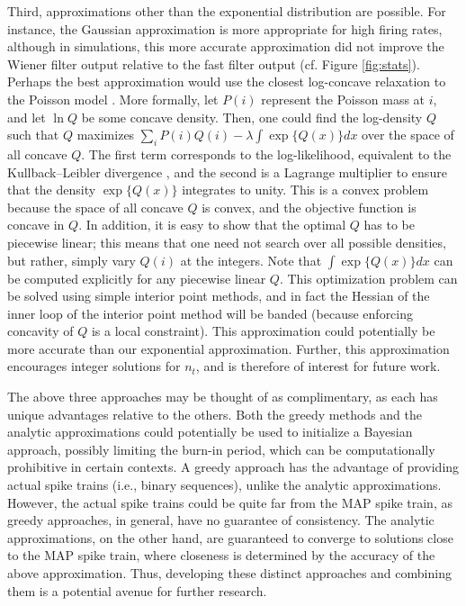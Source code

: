 Third, approximations other than the exponential distribution are possible. For instance, the Gaussian approximation is more appropriate for high firing rates, although in simulations, this more accurate approximation did not improve the Wiener filter output relative to the fast filter output (cf. Figure \ref{fig:stats}).  %
Perhaps the best approximation would use the closest log-concave relaxation to the Poisson model \cite{KoenkerMizera10}. More formally, let $P(i)$ represent the Poisson mass at $i$, and let $\ln Q$ be some concave density.  Then, one could find the log-density $Q$ such that $Q$ maximizes $\sum_i P(i) Q(i) - \lambda \int \exp \{Q(x)\} dx$ over the space of all concave $Q$. The first term corresponds to the log-likelihood, equivalent to the Kullback--Leibler divergence \cite{CoverThomas91}, and the second is a Lagrange multiplier to ensure that the density $\exp\{Q(x)\}$ integrates to unity. This is a convex problem because the space of all concave $Q$ is convex, and the objective function is concave in $Q$. In addition, it is easy to show that the optimal $Q$ has to be piecewise linear; this means that one need not search over all possible densities, but rather, simply vary $Q(i)$ at the integers. Note that $\int \exp\{Q(x)\} dx$ can be computed explicitly for any piecewise linear $Q$. This optimization problem can be solved using simple interior point methods, and in fact the Hessian of the inner loop of the interior point method will be banded (because enforcing concavity of $Q$ is a local constraint). This approximation could potentially be more accurate than our exponential approximation.  Further, this approximation encourages integer solutions for $n_t$, and is therefore of interest for future work. %

The above three approaches may be thought of as complimentary, as each has unique advantages relative to the others.  Both the greedy methods and the analytic approximations could potentially be used to initialize a Bayesian approach, possibly limiting the burn-in period, which can be computationally prohibitive in certain contexts.  A greedy approach has the advantage of providing actual spike trains (i.e., binary sequences), unlike the analytic approximations.  However, the actual spike trains could be quite far from the MAP spike train, as greedy approaches, in general, have no guarantee of consistency.  The analytic approximations, on the other hand, are guaranteed to converge to solutions  close to the MAP spike train, where closeness is determined by the accuracy of the above approximation.  Thus, developing these distinct approaches and combining them is a potential avenue for further research.  


